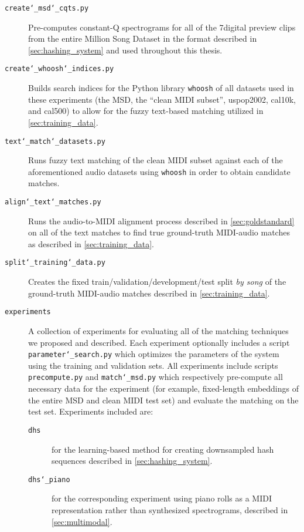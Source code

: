 \begin{description}
\item[\texttt{create\char`_msd\char`_cqts.py}] Pre-computes constant-Q spectrograms for all of the 7digital preview clips \cite{schindler2012facilitating} from the entire Million Song Dataset \cite{bertin2011million} in the format described in \cref{sec:hashing_system} and used throughout this thesis.
\item[\texttt{create\char`_whoosh\char`_indices.py}] Builds search indices for the Python library \texttt{whoosh} of all datasets used in these experiments (the MSD, the ``clean MIDI subset'', uspop2002, cal10k, and cal500) to allow for the fuzzy text-based matching utilized in \cref{sec:training_data}.
\item[\texttt{text\char`_match\char`_datasets.py}] Runs fuzzy text matching of the clean MIDI subset against each of the aforementioned audio datasets using \texttt{whoosh} in order to obtain candidate matches.
\item[\texttt{align\char`_text\char`_matches.py}] Runs the audio-to-MIDI alignment process described in \cref{sec:goldstandard} on all of the text matches to find true ground-truth MIDI-audio matches as described in \cref{sec:training_data}.
\item[\texttt{split\char`_training\char`_data.py}] Creates the fixed train/validation/development/test split {\em by song} of the ground-truth MIDI-audio matches described in \cref{sec:training_data}.
\item[\texttt{experiments}] A collection of experiments for evaluating all of the matching techniques we proposed and described.
Each experiment optionally includes a script \texttt{parameter\char`_search.py} which optimizes the parameters of the system using the training and validation sets.
All experiments include scripts \texttt{precompute.py} and \texttt{match\char`_msd.py} which respectively pre-compute all necessary data for the experiment (for example, fixed-length embeddings of the entire MSD and clean MIDI test set) and evaluate the matching on the test set.
Experiments included are:
\begin{description}
\item[\texttt{dhs}] for the learning-based method for creating downsampled hash sequences described in \cref{sec:hashing_system}.
\item[\texttt{dhs\char`_piano}] for the corresponding experiment using piano rolls as a MIDI representation rather than synthesized spectrograms, described in \cref{sec:multimodal}.

\end{description}
\end{description}
